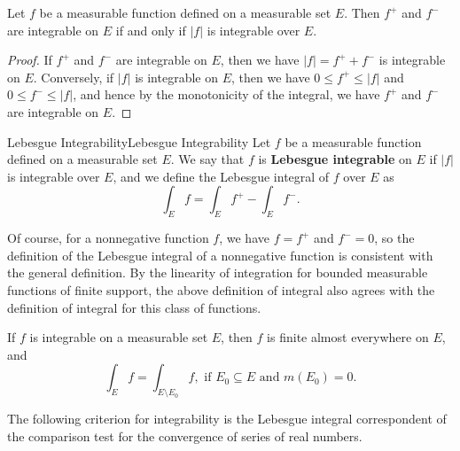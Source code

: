 \documentclass[../main.tex]{subfiles}
\begin{document}
\begin{proposition}{}{}
	Let $f$ be a measurable function defined on a measurable set $E$. Then $f^+$ and $f^-$ are integrable on $E$ if and only if $|f|$ is integrable over $E$.
\end{proposition}
\begin{proof}
	If $f^+$ and $f^-$ are integrable on $E$, then we have $|f| = f^+ + f^-$ is integrable on $E$. Conversely, if $|f|$ is integrable on $E$, then we have $0 \leq f^+ \leq |f|$ and $0 \leq f^- \leq |f|$, and hence by the monotonicity of the integral, we have $f^+$ and $f^-$ are integrable on $E$.
\end{proof}

\begin{definition}{Lebesgue Integrability}{Lebesgue Integrability}
	Let $f$ be a measurable function defined on a measurable set $E$. We say that $f$ is \textbf{Lebesgue integrable} on $E$ if $|f|$ is integrable over $E$, and we define the Lebesgue integral of $f$ over $E$ as
	\begin{equation}
		\int_E f = \int_E f^+ - \int_E f^-.
	\end{equation}
\end{definition}

Of course, for a nonnegative function $f$, we have $f = f^+$ and $f^- = 0$, so the definition of the Lebesgue integral of a nonnegative function is consistent with the general definition. By the linearity of integration for bounded measurable functions of finite support, the above definition of integral also agrees with the definition of integral for this class of functions.

\begin{proposition}{}{}
	If $f$ is integrable on a measurable set $E$, then $f$ is finite almost everywhere on $E$, and
	\begin{equation*}
		\int_E f = \int_{E \setminus E_0} f, \text{ if } E_0 \subseteq E \text{ and } m(E_0) = 0.
	\end{equation*}
\end{proposition}

The following criterion for integrability is the Lebesgue integral correspondent of the comparison test for the convergence of series of real numbers.
\end{document}
